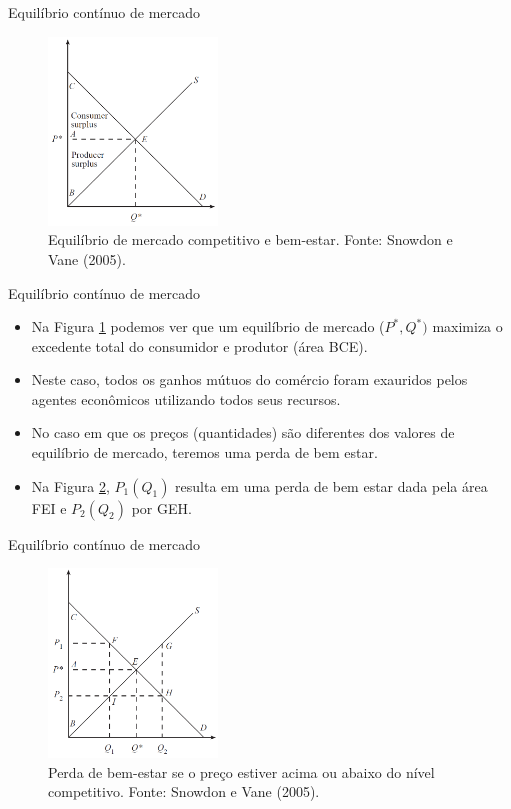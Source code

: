 \documentclass[10pt]{beamer}
\begin{document}
\begin{frame}{Equilíbrio contínuo de mercado}
    \begin{figure}
        \centering
        \includegraphics[width=0.4\textwidth]{./figures/aula11_fig7.PNG}
        \caption{Equilíbrio de mercado competitivo e bem-estar. Fonte: Snowdon e Vane (2005).}
        \label{fig4}
    \end{figure}
\end{frame}

\begin{frame}{Equilíbrio contínuo de mercado}
    \begin{itemize}
        \item Na Figura \ref{fig4} podemos ver que um equilíbrio de mercado ($P^*,Q^*)$ maximiza o excedente total do consumidor e produtor (área BCE).
        \bigskip
        \item Neste caso, todos os ganhos mútuos do comércio foram exauridos pelos agentes econômicos utilizando todos seus recursos.
        \bigskip
        \item No caso em que os preços (quantidades) são diferentes dos valores de equilíbrio de mercado, teremos uma perda de bem estar.
        \bigskip
        \item Na Figura \ref{fig5}, $P_1(Q_1)$ resulta em uma perda de bem estar dada pela área FEI e $P_2(Q_2)$ por GEH.
    \end{itemize}
\end{frame}

\begin{frame}{Equilíbrio contínuo de mercado}
    \begin{figure}
        \centering
        \includegraphics[width=0.4\textwidth]{./figures/aula11_fig8.PNG}
        \caption{Perda de bem-estar se o preço estiver acima ou abaixo do nível competitivo. Fonte: Snowdon e Vane (2005).}
        \label{fig5}
    \end{figure}
\end{frame}
\end{document}
